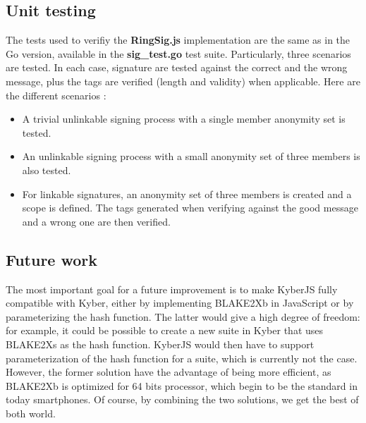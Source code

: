 \subsection{Unit testing}
The tests used to verifiy the \textbf{RingSig.js} implementation are the same as in the Go version, available in the \textbf{sig\_test.go} test suite. Particularly, three scenarios are tested. In each case, signature are tested against the correct and the wrong message, plus the tags are verified (length and validity) when applicable. Here are the different scenarios :
\begin{itemize}
	\item A trivial unlinkable signing process with a single member anonymity set is tested.
	\item An unlinkable signing process with a small anonymity set of three members is also tested. 
	\item  For linkable signatures, an anonymity set of three members is created and a scope is defined. The tags generated when verifying against the good message and a wrong one are then verified.
\end{itemize}
\subsection{Future work}
\label{subsec:ring_sig_future_work}
The most important goal for a future improvement is to make KyberJS fully compatible with Kyber, either by implementing BLAKE2Xb in JavaScript or by parameterizing the hash function. The latter would give a high degree of freedom: for example, it could be possible to create a new suite in Kyber that uses BLAKE2Xs as the hash function. KyberJS would then have to support parameterization of the hash function for a suite, which is currently not the case. However, the former solution have the advantage of being more efficient, as BLAKE2Xb is optimized for 64 bits processor, which begin to be the standard in today smartphones. Of course, by combining the two solutions, we get the best of both world.